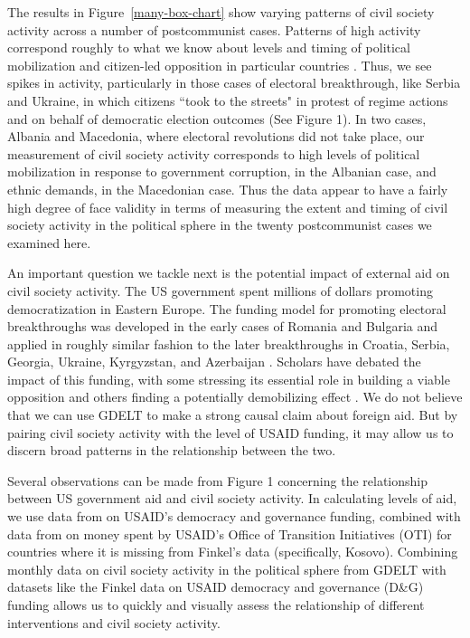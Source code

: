 \documentclass[10pt]{article}
\begin{document}
The results in Figure~\ref{many-box-chart} show varying patterns of civil society activity across a number of postcommunist cases.  Patterns of high activity correspond roughly to what we know about levels and timing of political mobilization and citizen-led opposition in particular countries \citep{bunce2011defeating,lane2009coloured}.  Thus, we see spikes in activity, particularly in those cases of electoral breakthrough, like Serbia and Ukraine, in which citizens ``took to the streets" in protest of regime actions and on behalf of democratic election outcomes (See Figure 1).  In two cases, Albania and Macedonia, where electoral revolutions did not take place, our measurement of civil society activity corresponds to high levels of political mobilization in response to government corruption, in the Albanian case, and ethnic demands, in the Macedonian case.  Thus the data appear to have a fairly high degree of face validity in terms of measuring the extent and timing of civil society activity in the political sphere in the twenty postcommunist cases we examined here.


An important question we tackle next is the potential impact of external aid on civil society activity.   The US government spent millions of dollars promoting democratization in Eastern Europe.  The funding model for promoting electoral breakthroughs was developed in the early cases of Romania and Bulgaria and applied in roughly similar fashion to the later breakthroughs in Croatia, Serbia, Georgia, Ukraine, Kyrgyzstan, and Azerbaijan \citep{carothers2004critical,kalandadze2009electoral}.  Scholars have debated the impact of this funding, with some stressing its essential role in building a viable opposition \citep{bunce2011defeating} and others finding a potentially demobilizing effect \citep{gagnon2006myth}.  We do not believe that we can use GDELT to make a strong causal claim about foreign aid.  But by pairing civil society activity with the level of USAID funding, it may allow us to discern broad patterns in the relationship between the two.   


Several observations can be made from Figure 1 concerning the relationship between US government aid and civil society activity.  In calculating levels of aid, we use data from \citet{finkel2007effects} on USAID's democracy and governance funding, combined with data from \citet{lawson2009usaid} on money spent by USAID's Office of Transition Initiatives (OTI) for countries where it is missing from Finkel's data (specifically, Kosovo).   Combining monthly data on civil society activity in the political sphere from GDELT with datasets like the Finkel data on USAID democracy and governance (D\&G) funding allows us to quickly and visually assess the relationship of different interventions and civil society activity.
\end{document}
